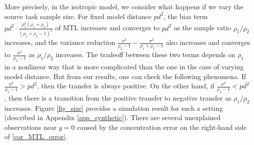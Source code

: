 More precisely, in the isotropic model, we consider what happens if we vary the source task sample size. For fixed model distance $pd^2$, the bias term $  pd^2\cdot \frac{\rho_1^2 (\rho_1+\rho_2)}{(\rho_1 + \rho_2 - 1)^3}$ of MTL increases and converges to $pd^2$ as the sample ratio $\rho_1/\rho_2$ increases, and the variance reduction $\frac{\sigma^2}{ \rho_2-1}  -\frac{\sigma^2}{\rho_1+\rho_2-1}$ also increases and converges to $\frac{\sigma^2}{\rho_2-1}$ as $\rho_1/\rho_2$ increases. The tradeoff between these two terms depends on $\rho_1$ in a nonlinear way that is more complicated than the one in the case of varying model distance. But from our results, one can check the following phenomena. If $\frac{\sigma^2}{\rho_2-1} > pd^2$, then the transfer is always positive. On the other hand, if $\frac{\sigma^2}{\rho_2-1} < pd^2$, then there is a transition from the positive transfer to negative transfer as $\rho_1/\rho_2$ increases. 
Figure \ref{fig_size} provides a simulation result for such a setting (described in Appendix \ref{app_synthetic}).
There are several unexplained observations near $y = 0$ caused by the concentration error on the right-hand side of \eqref{cor_MTL_error}.



